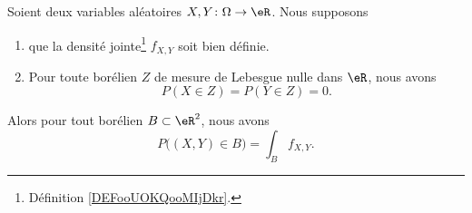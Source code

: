 \begin{proposition}	\label{PROPooPDIWooHzjqcZ}
	Soient deux variables aléatoires \(X,Y \colon \Omega\to \eR  \). Nous supposons
	\begin{enumerate}
		\item
		      que la densité jointe\footnote{Définition \ref{DEFooUOKQooMIjDkr}.} \( f_{X,Y}\) soit bien définie.
		\item
		      Pour toute borélien \( Z\) de mesure de Lebesgue nulle dans \( \eR\), nous avons
		      \begin{equation}
			      P(X\in Z)=P(Y\in Z)=0.
		      \end{equation}
	\end{enumerate}
	Alors pour tout borélien \( B\subset \eR^2\), nous avons
	\begin{equation}
		P\big( (X,Y)\in B \big)=\int_Bf_{X,Y}.
	\end{equation}
\end{proposition}

